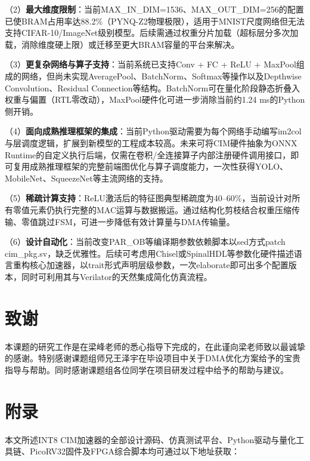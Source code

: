 \documentclass[12pt, a4paper]{article}
\begin{document}
（2）\textbf{最大维度限制}：当前MAX\_IN\_DIM=1536、MAX\_OUT\_DIM=256的配置已使BRAM占用率达88.2\%（PYNQ-Z2物理极限），适用于MNIST尺度网络但无法支持CIFAR-10/ImageNet级别模型。后续需通过权重分片加载（超标层分多次加载，消除维度硬上限）或迁移至更大BRAM容量的平台来解决。

（3）\textbf{更复杂网络与算子支持}：当前系统已支持Conv + FC + ReLU + MaxPool组成的网络，但尚未实现AveragePool、BatchNorm、Softmax等操作以及Depthwise Convolution、Residual Connection等结构。BatchNorm可在量化阶段静态折叠入权重与偏置（RTL零改动），MaxPool硬件化可进一步消除当前约1.24 ms的Python侧开销。

（4）\textbf{面向成熟推理框架的集成}：当前Python驱动需要为每个网络手动编写im2col与层调度逻辑，扩展到新模型的工程成本较高。未来可将CIM硬件抽象为ONNX Runtime的自定义执行后端，仅需在卷积/全连接算子内部注册硬件调用接口，即可复用成熟推理框架的完整前端图优化与算子调度能力，一次性获得YOLO、MobileNet、SqueezeNet等主流网络的支持。

（5）\textbf{稀疏计算支持}：ReLU激活后的特征图典型稀疏度为40--60\%，当前设计对所有零值元素仍执行完整的MAC运算与数据搬运。通过结构化剪枝结合权重压缩传输、零值跳过FSM，可进一步降低有效计算量与DMA传输量。

（6）\textbf{设计自动化}：当前改变PAR\_OB等编译期参数依赖脚本以sed方式patch cim\_pkg.sv，缺乏优雅性。后续可考虑用Chisel或SpinalHDL等参数化硬件描述语言重构核心加速器，以trait形式声明层级参数，一次elaborate即可出多个配置版本，同时可利用其与Verilator的天然集成简化仿真流程。


\section{致\hspace{1em}谢}

本课题的研究工作是在梁峰老师的悉心指导下完成的，在此谨向梁老师致以最诚挚的感谢。特别感谢课题组师兄王泽宇在毕设项目中关于DMA优化方案给予的宝贵指导与帮助。同时感谢课题组各位同学在项目研发过程中给予的帮助与建议。
\section{附\hspace{1em}录}

本文所述INT8 CIM加速器的全部设计源码、仿真测试平台、Python驱动与量化工具链、PicoRV32固件及FPGA综合脚本均可通过以下地址获取：
\end{document}
